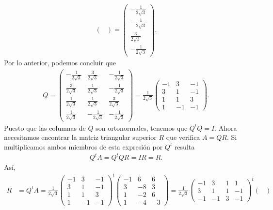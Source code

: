 \documentclass[11pt,letterpaper]{article}
\begin{document}
\begin{itemize}
\begin{align*}
\begin{pmatrix}
\end{pmatrix} = \begin{pmatrix}
-\frac{1}{2\sqrt{3}}\\ -\frac{1}{2\sqrt{3}}\\ \frac{3}{2\sqrt{3}} \\ -\frac{1}{2\sqrt{3}}
\end{pmatrix}.
\end{align*}
Por lo anterior, podemos concluir que 
\begin{align*}
Q= \begin{pmatrix}
-\frac{1}{2\sqrt{3}}& \frac{3}{2\sqrt{3}} &-\frac{1}{2\sqrt{3}}\\
\frac{3}{2\sqrt{3}} & \frac{1}{2\sqrt{3}} &-\frac{1}{2\sqrt{3}}\\
\frac{1}{2\sqrt{3}} & \frac{1}{2\sqrt{3}} & \frac{3}{2\sqrt{3}}\\
\frac{1}{2\sqrt{3}} & -\frac{1}{2\sqrt{3}}&-\frac{1}{2\sqrt{3}}
\end{pmatrix} = \frac{1}{2\sqrt{3}}\begin{pmatrix}
-1 & 3 &-1\\
3 & 1 & -1\\
1& 1 & 3\\
1 & -1 & -1
\end{pmatrix}.
\end{align*}
Puesto que las columnas de $Q$ son ortonormales, tenemos que $Q^tQ = I$. Ahora necesitamos encontrar la matriz triangular superior $R$ que verifica $A = Q R$. Si multiplicamos ambos miembros de esta expresión por $Q^t$ resulta
\begin{align*}
Q^t A = Q^t QR=IR=R.
\end{align*}
Así,
\begin{align*}
R&= Q^t A = \frac{1}{2\sqrt{3}}\begin{pmatrix}
-1 & 3 &-1\\
3 & 1 & -1\\
1& 1 & 3\\
1 & -1 & -1
\end{pmatrix}^t \begin{pmatrix}
-1 & 6 & 6\\
 3 &-8 & 3\\
 1 &-2 & 6\\
 1 &-4 &-3 
\end{pmatrix} = \frac{1}{2\sqrt{3}}\begin{pmatrix}
-1 & 3 & 1 & 1\\
 3 & 1 & 1 & -1\\
-1 &-1 & 3 & -1
\end{pmatrix}^t \begin{pmatrix}

\end{pmatrix}
\end{align*}
\end{itemize}
\end{document}
